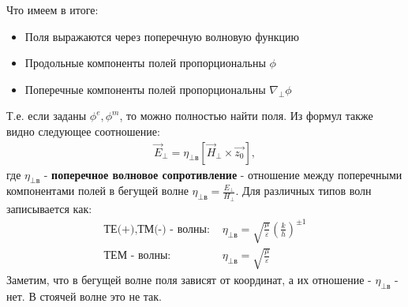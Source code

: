 Что имеем в итоге:
\begin{itemize}
  \item Поля выражаются через поперечную волновую функцию
  \item Продольные компоненты полей пропорциональны $\phi$
  \item Поперечные компоненты полей пропорциональны $\nabla_{\perp} \phi$
\end{itemize}
Т.е. если заданы $\phi^e,\phi^m$, то можно полностью найти поля. Из формул также видно следующее соотношение:
\begin{align*}
  \vec{E}_{\perp} = \eta_{\perp \text{в}}[\vec{H}_{\perp}\times \vec{z_0}] ,
\end{align*}
где $\eta_{\perp \text{в}}$  - \textbf{поперечное волновое сопротивление} - отношение между поперечными компонентами полей в
бегущей волне $\eta_{\perp \text{в}} = \frac{E_{\perp}}{H_{\perp}}$.
Для различных типов волн записывается как:
\begin{align*}
  \text{ТЕ(+),ТМ(-) - волны: }&\eta_{\perp \text{в}} = \sqrt{\frac{\mu}{\varepsilon}}\left(\frac{k}{h}\right)^{\pm1}\\
  \text{ТЕМ - волны: }&\eta_{\perp \text{в}} = \sqrt{\frac{\mu}{\varepsilon}}
\end{align*}
Заметим, что в бегущей волне поля зависят от координат, а их отношение - $\eta_{\perp \text{в}}$ - нет. В стоячей волне
это не так.

